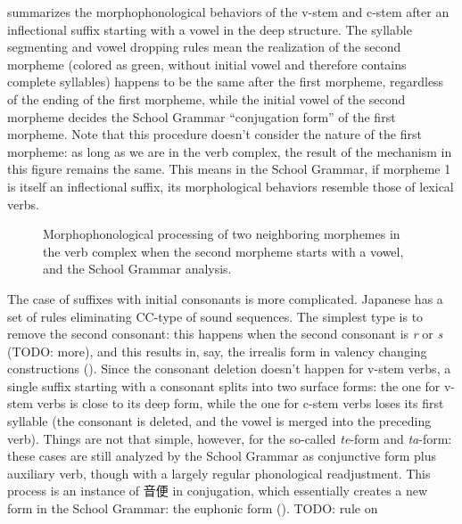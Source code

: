 \documentclass[UTF8, a4paper, oneside, scheme=plain]{ctexart}
\newcommand*{\citepage}[1]{pp.~{#1}}
\newcommand{\corpus}[1]{\emph{#1}}
\begin{document}
 summarizes the morphophonological behaviors 
of the v-stem and c-stem after an inflectional suffix starting with a vowel in the deep structure.
The syllable segmenting and vowel dropping rules mean the realization of the second morpheme
(colored as green, without initial vowel and therefore contains complete syllables)
happens to be the same after the first morpheme,
regardless of the ending of the first morpheme,
while the initial vowel of the second morpheme
decides the School Grammar ``conjugation form'' of the first morpheme.
Note that this procedure doesn't consider the nature of the first morpheme:
as long as we are in the verb complex,
the result of the mechanism in this figure remains the same.
This means in the School Grammar,
if morpheme 1 is itself an inflectional suffix,
its morphological behaviors resemble those of lexical verbs.

\begin{figure}[H]
    \centering
    
    \caption{Morphophonological processing of two neighboring morphemes in the verb complex
    when the second morpheme starts with a vowel, 
    and the School Grammar analysis.}
    \label{fig:vowel-start-suffix-verb}
\end{figure}

The case of suffixes with initial consonants is more complicated.
Japanese has a set of rules eliminating CC-type of sound sequences.
The simplest type is to remove the second consonant:
this happens when the second consonant is \corpus{r} or \corpus{s} (TODO: more),
and this results in,
say, the irrealis form in valency changing constructions ().
Since the consonant deletion doesn't happen for v-stem verbs,
a single suffix starting with a consonant
splits into two surface forms:
the one for v-stem verbs is close to its deep form,
while the one for c-stem verbs loses its first syllable
(the consonant is deleted, and the vowel is merged into the preceding verb).
Things are not that simple, however, for the so-called \corpus{te}-form and \corpus{ta}-form:
these cases are still analyzed by the School Grammar as 
conjunctive form plus auxiliary verb,
though with a largely regular phonological readjustment.
This process is an instance of 音便 in conjugation,
which essentially creates a new form in the School Grammar:
the euphonic form ().
TODO: rule on \citet[\citepage{99}]{akiyama2012japanese}
\end{document}
